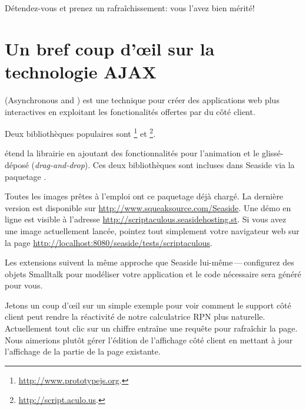 \documentclass[a4paper,10pt,twoside]{book}
\begin{document}

\noindent{} Détendez-vous et prenez un rafraîchissement: vous l'avez bien mérité!


\section{Un bref coup d'\oe il sur la technologie AJAX}


 (Asynchronous  and ) est une
technique pour créer des applications web plus interactives en
exploitant les fonctionalités offertes par \jscript du côté client.

Deux bibliothèques \jscript{} populaires sont \ind{\pjs}\footnote{\url{http://www.prototypejs.org}.} et \ind{\sau}\footnote{\url{http://script.aculo.us}.}.


\sau{} étend la librairie \pjs{} en ajoutant des fonctionnalités pour
l'animation et le glissé-déposé (\emph{drag-and-drop}).
Ces deux bibliothèques sont incluses dans Seaside via la paquetage
.

Toutes les images prêtes à l'emploi ont ce paquetage déjà chargé. La
dernière version est disponible sur
\url{http://www.squeaksource.com/Seaside}.
Une démo en ligne est visible à l'adresse 
\url{http://scriptaculous.seasidehosting.st}.
Si vous avez une image actuellement lancée, pointez tout simplement
votre navigateur web sur la page
\url{http://localhost:8080/seaside/tests/scriptaculous}.

Les extensions \sau{} suivent la même approche que Seaside
lui-même\,---\,configurez des objets Smalltalk pour modéliser votre
application et le code \jscript{} nécessaire sera généré pour vous.

Jetons un coup d'\oe il sur un simple exemple pour voir comment le support
\jscript{} côté client peut rendre la réactivité de notre calculatrice
RPN plus naturelle.
Actuellement tout clic sur un chiffre entraîne une requête pour
rafraîchir la page. Nous aimerions plutôt gérer l'édition de
l'affichage côté client en mettant à jour l'affichage 
de la partie  de la page existante.
\end{document}
